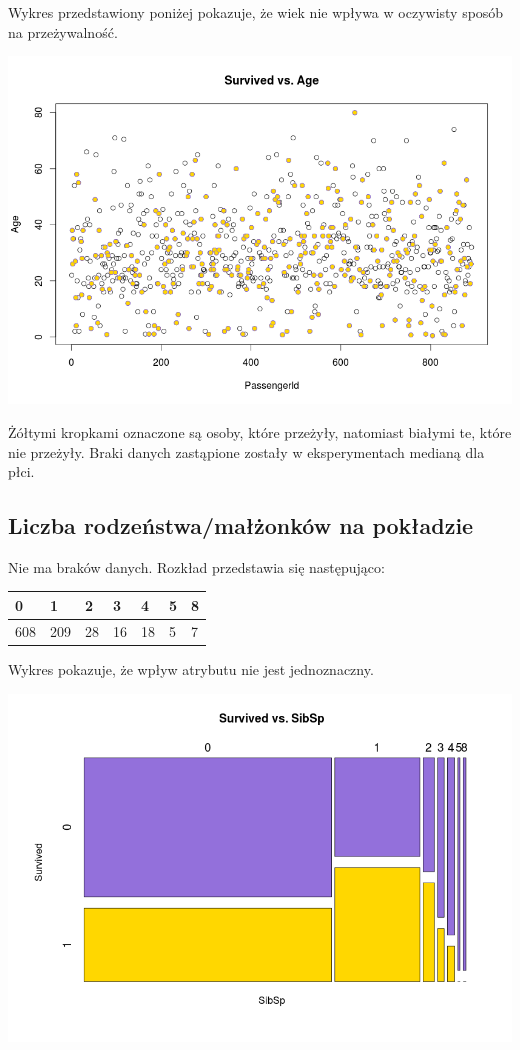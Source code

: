 \documentclass{article}
\begin{document}
Wykres przedstawiony poniżej pokazuje, że wiek nie wpływa w oczywisty sposób na przeżywalność.

\includegraphics[scale=0.40]{images/survived-vs-age.png}

Żółtymi kropkami oznaczone są osoby, które przeżyły, natomiast białymi te, które nie przeżyły. Braki danych zastąpione zostały w eksperymentach medianą dla płci.

\subsection{Liczba rodzeństwa/małżonków na pokładzie}

Nie ma braków danych. Rozkład przedstawia się następująco:
\begin{center}
    \begin{tabular}{| l | l | l | l | l | l | l |}
    \hline
0 &  1  & 2  & 3  & 4 &  5 &  8  \\ \hline
608 & 209 & 28 & 16 & 18 &  5 &  7 \\
    \hline
    \end{tabular}
\end{center}

Wykres pokazuje, że wpływ atrybutu nie jest jednoznaczny.

\includegraphics[scale=0.40]{images/survived-vs-sibsp.png}
\end{document}
